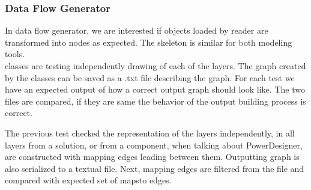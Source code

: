\subsubsection{Data Flow Generator}

In data flow generator, we are interested if objects loaded by reader are transformed into nodes as expected.
The skeleton is similar for both modeling tools. \\

 classes are testing independently drawing of each of the layers. The graph created by the  classes can be saved as a .txt file describing the graph. 
For each test we have an expected output of how a correct output graph should look like. The two files are compared, if they are same the behavior of the output building process is correct.

The previous test checked the representation of the layers independently, in  all layers from a solution, or from a component, when talking about PowerDesigner, are constructed with mapping edges leading between them. Outputting graph is also serialized to a textual file. Next, mapping edges are filtered from the file and compared with expected set of maps\textunderscore to edges. 